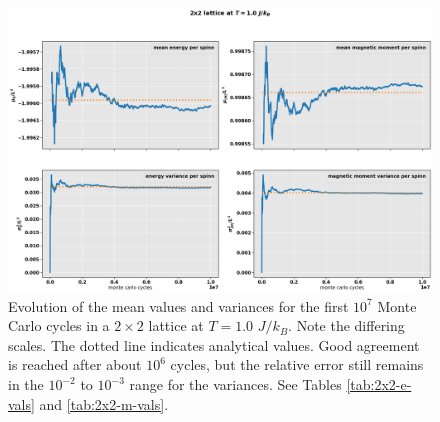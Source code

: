 \documentclass[]{article}
\begin{document}
\begin{figure}[!h]
	\centering
	\includegraphics[width=1\linewidth]{./figs/2x2.png}
	\caption{Evolution of the mean values and variances for the first $10^7$ Monte Carlo cycles in a $2 \times 2$ lattice at $T = 1.0$ $J/k_B$. Note the differing scales. The dotted line indicates analytical values. Good agreement is reached after about $10^6$ cycles, but the relative error still remains in the $10^{-2}$ to $10^{-3}$ range for the variances. See Tables \ref{tab:2x2-e-vals} and \ref{tab:2x2-m-vals}.}
	\label{fig:2x2}
\end{figure}
\end{document}
